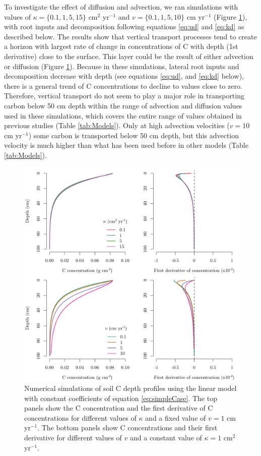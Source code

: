 \documentclass[11pt, oneside, a4paper]{article}   	%
\begin{document}
To investigate the effect of diffusion and advection, we ran simulations with values of $\kappa = \{0.1, 1, 5, 15\}$ cm$^2$ yr$^{-1}$ and $v = \{0.1, 1, 5, 10 \}$ cm yr$^{-1}$  (Figure \ref{fig:AdvectionDiffusion}), with root inputs and decomposition following equations \ref{eq:ud} and \ref{eq:kd} as described below. The results show that vertical transport processes tend to create a horizon with largest rate of change in concentrations of C with depth (1st derivative) close to the surface. This layer could be the result of either advection or diffusion (Figure \ref{fig:AdvectionDiffusion}). Because in these simulations, lateral root inputs and decomposition decrease with depth (see equations \ref{eq:ud}, and \ref{eq:kd} below), there is a general trend of C concentrations to decline to values close to zero. Therefore, vertical transport do not seem to play a major role in transporting carbon below 50 cm depth within the range of advection and diffusion values used in these simulations, which covers the entire range of values obtained in previous studies (Table \ref{tab:Models}). Only at high advection velocities ($v=10$ cm yr$^{-1}$) some carbon is transported below 50 cm depth, but this advection velocity is much higher than what has been used before in other models (Table \ref{tab:Models}).

\begin{figure}[htbp]
   \centering
   \includegraphics[width=\textwidth]{Figures/simulationsKappaV.pdf} %
   \caption{Numerical simulations of soil C depth profiles using the linear model with constant coefficients of equation \ref{eq:simpleCase}. The top panels show the C concentration and the first derivative of C concentrations for different values of $\kappa$ and a fixed value of $v = 1$ cm yr$^{-1}$. The bottom panels show C concentrations and their first derivative for different values of $v$ and a constant value of $\kappa = 1$ cm$^2$ yr$^{-1}$. }
   \label{fig:AdvectionDiffusion}
\end{figure}
\end{document}
